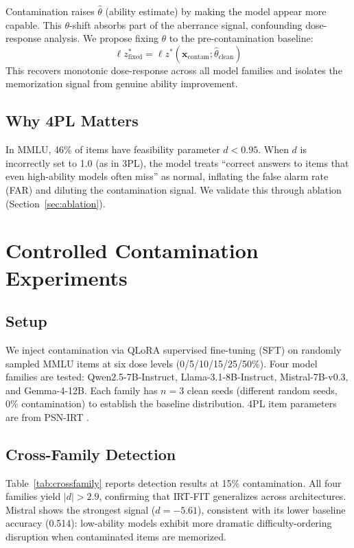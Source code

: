 \documentclass[11pt,a4paper]{article}
\begin{document}
Contamination raises $\hat{\theta}$ (ability estimate) by making the model appear more capable. This $\theta$-shift absorbs part of the aberrance signal, confounding dose-response analysis. We propose fixing $\theta$ to the pre-contamination baseline:
\begin{equation}
\ell z^*_{\text{fixed}} = \ell z^*(\mathbf{x}_{\text{contam}}; \hat{\theta}_{\text{clean}})
\end{equation}
This recovers monotonic dose-response across all model families and isolates the memorization signal from genuine ability improvement.

\subsection{Why 4PL Matters}

In MMLU, 46\% of items have feasibility parameter $d < 0.95$. When $d$ is incorrectly set to 1.0 (as in 3PL), the model treats ``correct answers to items that even high-ability models often miss'' as normal, inflating the false alarm rate (FAR) and diluting the contamination signal. We validate this through ablation (Section~\ref{sec:ablation}).

\section{Controlled Contamination Experiments}\label{sec:ctrl}

\subsection{Setup}

We inject contamination via QLoRA supervised fine-tuning (SFT) on randomly sampled MMLU items at six dose levels (0/5/10/15/25/50\%). Four model families are tested: Qwen2.5-7B-Instruct, Llama-3.1-8B-Instruct, Mistral-7B-v0.3, and Gemma-4-12B. Each family has $n=3$ clean seeds (different random seeds, 0\% contamination) to establish the baseline distribution. 4PL item parameters are from PSN-IRT \citep{psnirt2026}.

\subsection{Cross-Family Detection}\label{sec:crossfamily}

Table~\ref{tab:crossfamily} reports detection results at 15\% contamination. All four families yield $|d| > 2.9$, confirming that IRT-FIT generalizes across architectures. Mistral shows the strongest signal ($d = -5.61$), consistent with its lower baseline accuracy (0.514): low-ability models exhibit more dramatic difficulty-ordering disruption when contaminated items are memorized.
\end{document}
